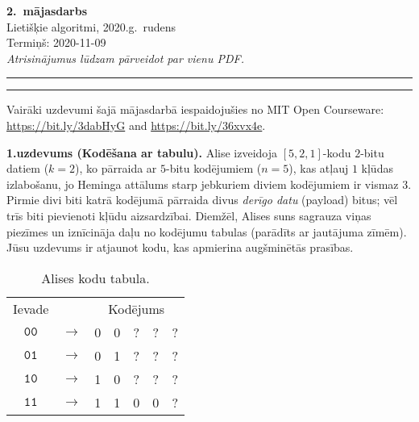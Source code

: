 \documentclass[a4paper,12pt]{article}
\begin{document}
\thispagestyle{empty}

\begin{center}
{\bf\Huge 2.\ mājasdarbs} \\[5pt]
Lietišķie algoritmi, 2020.g.\ rudens \\
Termiņš: 2020-11-09\\[5pt]
{\em Atrisinājumus lūdzam pārveidot par vienu PDF.}
\end{center}

\hrule
\vspace{2pt}
\hrule
\vspace{12pt}



{\footnotesize
Vairāki uzdevumi šajā mājasdarbā iespaidojušies no MIT Open Courseware:
\url{https://bit.ly/3dabHyG} and \url{https://bit.ly/36xvx4e}.\\
}


\vspace{10pt}
{\bf 1.uzdevums (Kodēšana ar tabulu).}
Alise izveidoja $[5,2,1]$-kodu $2$-bitu datiem ($k=2$), 
ko pārraida ar $5$-bitu kodējumiem
($n=5$), kas atļauj $1$ kļūdas izlabošanu, 
jo He\-min\-ga attālums starp jebkuriem diviem kodējumiem 
ir vismaz $3$.
Pirmie divi biti katrā kodējumā pārraida divus {\em derīgo datu} (payload)
bitus; vēl trīs biti pievienoti kļūdu aizsardzībai.
Diemžēl, Alises suns sagrauza viņas piezīmes un iznīcināja
daļu no kodējumu tabulas (parādīts ar jautājuma zī\-mēm).
Jūsu uzdevums ir atjaunot kodu, kas apmierina augš\-mi\-nē\-tās prasības.

{\footnotesize
\begin{table}[h]
\begin{center}
\begin{tabular}{ccccccc}
Ievade & & \multicolumn{5}{c}{Kodējums} \\
$\mathtt{00}$ & $\rightarrow$ & 0 & 0 & ? & ? & ? \\
$\mathtt{01}$ & $\rightarrow$ & 0 & 1 & ? & ? & ? \\
$\mathtt{10}$ & $\rightarrow$ & 1 & 0 & ? & ? & ? \\
$\mathtt{11}$ & $\rightarrow$ & 1 & 1 & 0 & 0 & ? \\
\end{tabular}
\caption{\label{tab:codes523} Alises kodu tabula.}
\end{center}
\end{table}
}
\end{document}
